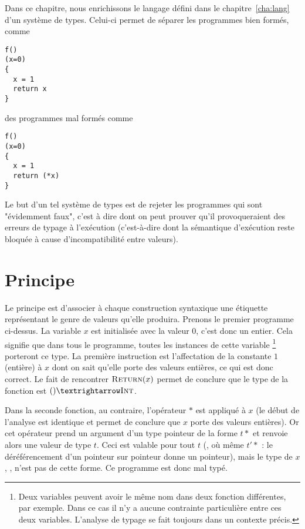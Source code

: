 Dans ce chapitre, nous enrichissons le langage défini dans le
chapitre~\ref{cha:lang} d'un système de types. Celui-ci permet de séparer les
programmes bien formés, comme

\begin{Verbatim}
f()
(x=0)
{
  x = 1
  return x
}
\end{Verbatim}

des programmes mal formés comme

\begin{Verbatim}
f()
(x=0)
{
  x = 1
  return (*x)
}
\end{Verbatim}

Le but d'un tel système de types est de rejeter les programmes qui sont
"évidemment faux", c'est à dire dont on peut prouver qu'il provoqueraient des
erreurs de typage à l'exécution (c'est-à-dire dont la sémantique d'exécution
reste bloquée à cause d'incompatibilité entre valeurs).

\section{Principe}

Le principe est d'associer à chaque construction syntaxique une étiquette
représentant le genre de valeurs qu'elle produira. Prenons le premier programme
ci-dessus. La variable $x$ est initialisée avec la valeur $0$, c'est donc un
entier. Cela signifie que dans tous le programme, toutes les instances de cette
variable
\footnote{Deux variables peuvent avoir le même nom dans deux fonction
  différentes, par exemple. Dans ce cas il n'y a aucune contrainte particulière
  entre ces deux variables. L'analyse de typage se fait toujours dans un
  contexte précis.
}
porteront ce type. La première instruction est l'affectation de la constante $1$
(entière) à $x$ dont on sait qu'elle porte des valeurs entières, ce qui est donc
correct. Le fait de rencontrer $\textsc{Return}(x)$ permet de conclure que le type de
la fonction est $() → \tInt$.

Dans la seconde fonction, au contraire, l'opérateur $*$ est appliqué à $x$ (le
début de l'analyse est identique et permet de conclure que $x$ porte des valeurs
entières). Or cet opérateur prend un argument d'un type pointeur de la forme
$t*$ et renvoie alors une valeur de type $t$. Ceci est valable pour tout $t$
(\tInt, \tFloat où même $t'*$ : le déréférencement d'un pointeur sur pointeur
donne un pointeur), mais le type de $x$, \tInt, n'est pas de cette forme. Ce
programme est donc mal typé.

